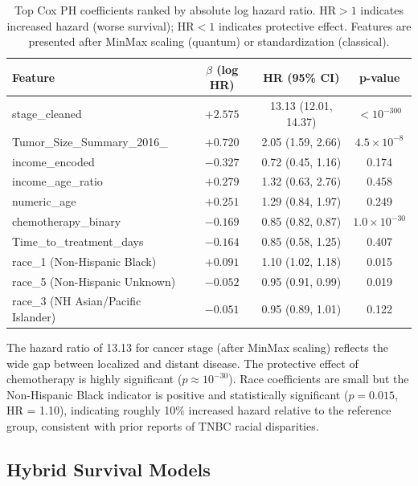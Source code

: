 \documentclass[12pt, letterpaper]{article}
\begin{document}
\begin{table}[h!]
\centering
\caption{Top Cox PH coefficients ranked by absolute log hazard ratio. $\text{HR} > 1$ indicates increased hazard (worse survival); $\text{HR} < 1$ indicates protective effect. Features are presented after MinMax scaling (quantum) or standardization (classical).}
\label{tab:cox_coefs}
\begin{tabular}{@{}lccc@{}}
\toprule
\textbf{Feature} & \textbf{$\beta$ (log HR)} & \textbf{HR (95\% CI)} & \textbf{p-value} \\
\midrule
stage\_cleaned                            & $+2.575$ & 13.13 (12.01, 14.37) & $< 10^{-300}$ \\
Tumor\_Size\_Summary\_2016\_              & $+0.720$ & 2.05 (1.59, 2.66)    & $4.5 \times 10^{-8}$ \\
income\_encoded                            & $-0.327$ & 0.72 (0.45, 1.16)    & 0.174 \\
income\_age\_ratio                         & $+0.279$ & 1.32 (0.63, 2.76)    & 0.458 \\
numeric\_age                               & $+0.251$ & 1.29 (0.84, 1.97)    & 0.249 \\
chemotherapy\_binary                       & $-0.169$ & 0.85 (0.82, 0.87)    & $1.0 \times 10^{-30}$ \\
Time\_to\_treatment\_days                   & $-0.164$ & 0.85 (0.58, 1.25)    & 0.407 \\
race\_1 (Non-Hispanic Black)               & $+0.091$ & 1.10 (1.02, 1.18)    & 0.015 \\
race\_5 (Non-Hispanic Unknown)             & $-0.052$ & 0.95 (0.91, 0.99)    & 0.019 \\
race\_3 (NH Asian/Pacific Islander)        & $-0.051$ & 0.95 (0.89, 1.01)    & 0.122 \\
\bottomrule
\end{tabular}
\end{table}

The hazard ratio of 13.13 for cancer stage (after MinMax scaling) reflects the wide gap between localized and distant disease. The protective effect of chemotherapy is highly significant ($p \approx 10^{-30}$). Race coefficients are small but the Non-Hispanic Black indicator is positive and statistically significant ($p = 0.015$, HR = 1.10), indicating roughly 10\% increased hazard relative to the reference group, consistent with prior reports of TNBC racial disparities.

\subsection{Hybrid Survival Models}
\end{document}
